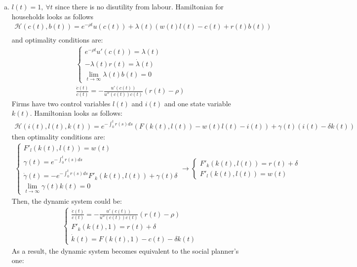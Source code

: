 \documentclass[a4paper]{article}
\begin{document}
\begin{enumerate}[1.]
\begin{enumerate}[(a)]
	\item $l(t) = 1,\ \forall t$ since there is no disutility from labour. Hamiltonian for households looks as follows
	\begin{align*}
	\mathscr{H}(c(t), b(t)) = e^{-\rho t}u(c(t)) + \lambda(t)(w(t)l(t) - c(t) + r(t)b(t))\\
	\end{align*}
	and optimality conditions are:
	\begin{align*}
	\begin{cases}
	e^{-\rho t}u'(c(t)) = \lambda(t)\\
	-\lambda(t)r(t) = \dot{\lambda}(t)\\
	\lim_{t \to \infty} \lambda(t)b(t) = 0
	\end{cases}\\
	\frac{\dot{c}(t)}{c(t)} = -\frac{u'(c(t))}{u''(c(t))c(t)}(r(t) - \rho)
	\end{align*}
	Firms have two control variables $l(t)$ and $i(t)$ and one state variable $k(t)$. Hamiltonian looks as follows:
	\begin{align*}
	\mathscr{H}(i(t), l(t), k(t)) = e^{-\int_0^tr(s)ds}(F(k(t), l(t)) - w(t)l(t) - i(t)) + \gamma(t)(i(t) - \delta k(t))
	\end{align*}
	then optimality conditions are:
	\begin{align*}
	\begin{cases}
	F'_l(k(t), l(t)) = w(t)\\
	\gamma(t) = e^{-\int_0^tr(s)ds}\\
	\dot{\gamma}(t) = -e^{-\int_0^tr(s)ds}F'_k(k(t), l(t)) + \gamma(t)\delta\\
	\lim_{t \to \infty} \gamma(t) k(t) = 0
	\end{cases} \to \begin{cases}
	F'_k(k(t), l(t)) = r(t) + \delta\\
	F'_l(k(t), l(t)) = w(t)
	\end{cases}
	\end{align*}
	Then, the dynamic system could be:
	\begin{align*}
	\begin{cases}
	\frac{\dot{c}(t)}{c(t)} = -\frac{u'(c(t))}{u''(c(t))c(t)}(r(t) - \rho)\\
	F'_k(k(t), 1) = r(t) + \delta\\
	\dot{k}(t) = F(k(t), 1) - c(t) - \delta k(t)
	\end{cases}
	\end{align*}
	As a result, the dynamic system becomes equivalent to the social planner's one:

\end{enumerate}
\end{enumerate}
\end{document}
